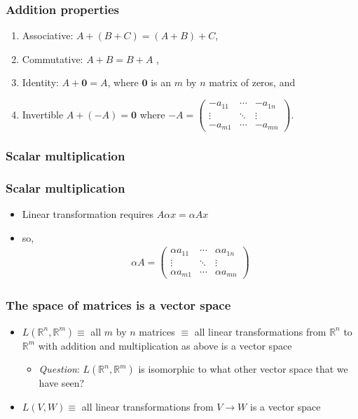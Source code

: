 \documentclass[compress]{beamer}
\def\R{\mathbb{R}}
\newcommand{\gmatrix}[1]{\begin{pmatrix} {#1}_{11} & \cdots &
    {#1}_{1n} \\ \vdots & \ddots & \vdots \\ {#1}_{m1} & \cdots &
    {#1}_{mn} \end{pmatrix}}
\theoremstyle{definition}
\begin{document}
\begin{frame}
  \frametitle{Addition properties}
  \begin{enumerate}
  \item Associative: $A+(B + C) = (A+B) + C$,
  \item Commutative: $A + B = B + A$ ,
  \item Identity: $A + \mathbf{0} = A$, where $\mathbf{0}$ is an $m$ by
    $n$ matrix of zeros, and
  \item Invertible $A + (-A) = \mathbf{0}$ where $-A = \gmatrix{-a}$.
  \end{enumerate}
\end{frame}

\subsubsection{Scalar multiplication}
\begin{frame}
  \frametitle{Scalar multiplication}
  \begin{itemize}
  \item Linear transformation requires $A \alpha x = \alpha A x$
  \item so,
    \begin{align*}
      \alpha A = \begin{pmatrix} \alpha a_{11} & \cdots &
        \alpha a_{1n} \\ \vdots & \ddots & \vdots \\ \alpha a_{m1} & \cdots &
        \alpha a_{mn} \end{pmatrix}
    \end{align*}
  \end{itemize}
\end{frame}

\begin{frame}\frametitle{The space of matrices is a vector space}
  \begin{itemize}
  \item $L(\R^n,\R^m) \equiv $ all $m$ by $n$ matrices $\equiv$ all
    linear transformations from $\R^n$ to $\R^m$ with addition and
    multiplication as above is a vector space
    \begin{itemize}
    \item \emph{Question}: $L(\R^n,\R^m)$ is isomorphic to what other
      vector space that we have seen?
    \end{itemize}
  \item $L(V,W) \equiv$ all linear transformations from $V \to W$ is a
    vector space
  \end{itemize}
\end{frame}
\end{document}
